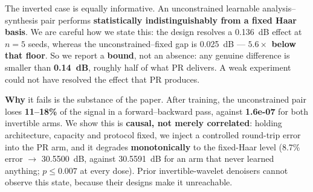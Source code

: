 \documentclass[conference]{IEEEtran}
\begin{document}
The inverted case is equally informative. An unconstrained learnable
analysis--synthesis pair performs \textbf{statistically indistinguishably from a
fixed Haar basis}. We are careful how we state this: the design resolves a
0.136~dB effect at $n=5$ seeds, whereas the unconstrained--fixed gap is
0.025~dB --- \textbf{$5.6\times$ below that floor}. So we report a \textbf{bound},
not an absence: any genuine difference is smaller than \textbf{0.14~dB}, roughly
half of what PR delivers. A weak experiment could not have resolved the effect
that PR produces.

\textbf{Why} it fails is the substance of the paper. After training, the
unconstrained pair loses \textbf{11--18\%} of the signal in a forward--backward
pass, against \textbf{1.6e-07} for both invertible arms. We show this is
\textbf{causal, not merely correlated}: holding architecture, capacity and
protocol fixed, we inject a controlled round-trip error into the PR arm, and it
degrades \textbf{monotonically} to the fixed-Haar level (8.7\% error $\to$
30.5500~dB, against 30.5591~dB for an arm that never learned anything;
$p \le 0.007$ at every dose). Prior invertible-wavelet denoisers cannot observe
this state, because their designs make it unreachable.
\end{document}
